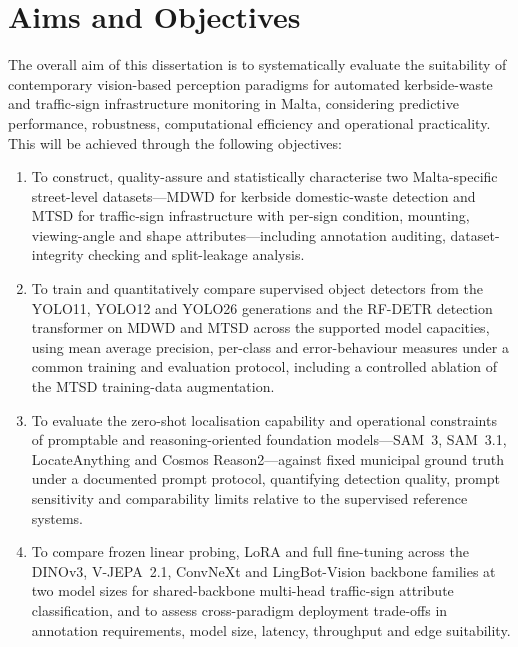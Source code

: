 \section{Aims and Objectives}
\label{sec:aims-objectives}

The overall aim of this dissertation is to systematically evaluate the suitability of contemporary vision-based perception paradigms for automated kerbside-waste and traffic-sign infrastructure monitoring in Malta, considering predictive performance, robustness, computational efficiency and operational practicality. This will be achieved through the following objectives:

\begin{enumerate}
  \item To construct, quality-assure and statistically characterise two Malta-specific street-level datasets---MDWD for kerbside domestic-waste detection and MTSD for traffic-sign infrastructure with per-sign condition, mounting, viewing-angle and shape attributes---including annotation auditing, dataset-integrity checking and split-leakage analysis.
  \item To train and quantitatively compare supervised object detectors from the YOLO11, YOLO12 and YOLO26 generations and the RF-DETR detection transformer on MDWD and MTSD across the supported model capacities, using mean average precision, per-class and error-behaviour measures under a common training and evaluation protocol, including a controlled ablation of the MTSD training-data augmentation.
  \item To evaluate the zero-shot localisation capability and operational constraints of promptable and reasoning-oriented foundation models---SAM~3, SAM~3.1, LocateAnything and Cosmos Reason2---against fixed municipal ground truth under a documented prompt protocol, quantifying detection quality, prompt sensitivity and comparability limits relative to the supervised reference systems.
  \item To compare frozen linear probing, LoRA and full fine-tuning across the DINOv3, V-JEPA~2.1, ConvNeXt and LingBot-Vision backbone families at two model sizes for shared-backbone multi-head traffic-sign attribute classification, and to assess cross-paradigm deployment trade-offs in annotation requirements, model size, latency, throughput and edge suitability.
\end{enumerate}

